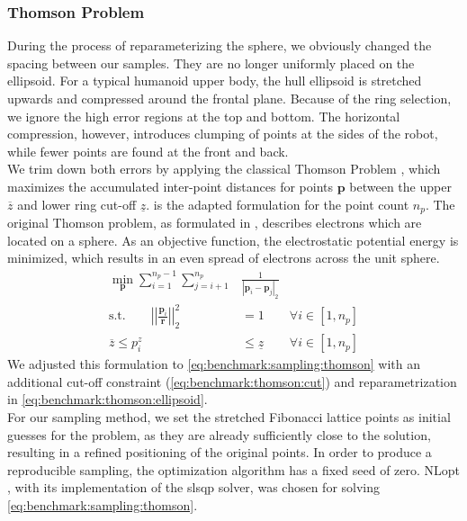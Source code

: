 \subsubsection{Thomson Problem} \label{sec:benchmark:sampling:thomson}
During the process of reparameterizing the sphere, we obviously changed the spacing between our samples.
They are no longer uniformly placed on the ellipsoid.
For a typical humanoid upper body, the hull ellipsoid is stretched upwards and compressed around the frontal plane.
Because of the ring selection, we ignore the high error regions at the top and bottom.
The horizontal compression, however, introduces clumping of points at the sides of the robot, while fewer points are found at the front and back. \\
We trim down both errors by applying the classical Thomson Problem \cite{thomson_1904}, which maximizes the accumulated inter-point distances for points $\bm p$ between the upper $\overline z$ and lower ring cut-off $\underline z$.
 is the adapted formulation for the point count $n_p$.
The original Thomson problem, as formulated in \cite{thomson_1904}, describes electrons which are located on a sphere.
As an objective function, the electrostatic potential energy is minimized, which results in an even spread of electrons across the unit sphere.
\begin{subequations}
\label{eq:benchmark:sampling:thomson}
  \begin{align}
  \min_{\bm p} \sum^{n_p-1}_{i=1} \sum^{n_p}_{j=i+1} & \frac{1}{|\bm p_i- \bm p_j|_2} & \\
  \text{s.t.} \qquad \left|\left|\frac{\bm p_i}{\bm r}\right|\right|_2^2 & = 1 & \forall i \in \left[ 1, n_p \right] \label{eq:benchmark:thomson:ellipsoid} \\
  \overline z \leq p_i^z & \leq \underline z &  \forall i \in \left[ 1, n_p \right] \label{eq:benchmark:thomson:cut}
  \end{align}
\end{subequations}
We adjusted this formulation to \cref{eq:benchmark:sampling:thomson} with an additional cut-off constraint (\cref{eq:benchmark:thomson:cut}) and reparametrization in \cref{eq:benchmark:thomson:ellipsoid}. \\
For our sampling method, we set the stretched Fibonacci lattice points as initial guesses for the problem, as they are already sufficiently close to the solution, resulting in a refined positioning of the original points.
In order to produce a reproducible sampling, the optimization algorithm has a fixed seed of zero.
NLopt \cite{NLopt}, with its implementation of the \acrshort{slsqp} \cite{kraft_1994} solver, was chosen for solving \cref{eq:benchmark:sampling:thomson}.

